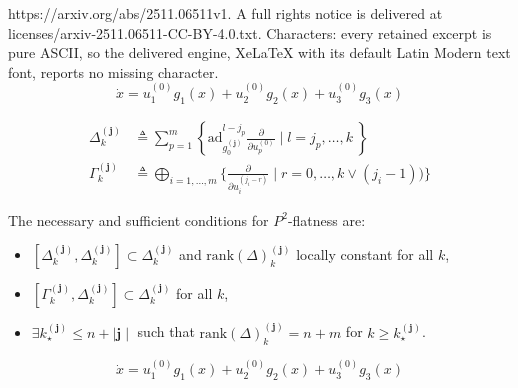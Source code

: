 \documentclass[10pt,a4paper]{amsart}
\newcommand{\ad}{\mathrm{ad}}
\newcommand{\bj}{\mathbf{j}}
\newcommand{\ddu}[2]{\frac{\partial}{\partial u_{#1}^{(#2)}}}
\newcommand{\mbf}[1]{\mathbf{#1}}
\newcommand{\rk}[1]{\mathrm{rank} \left(#1\right)}
\begin{document}
https://arxiv.org/abs/2511.06511v1. A full rights notice is delivered at licenses/arxiv-2511.06511-CC-BY-4.0.txt. Characters: every retained excerpt is pure ASCII, so the delivered engine, XeLaTeX with its default Latin Modern text font, reports no missing character.
\begin{equation}\label{3inputs}
\dot{x} = u_{1}^{(0)}g_{1}(x) + u_{2}^{(0)}g_{2}(x) + u_{3}^{(0)}g_{3}(x)
\end{equation}

\begin{equation}\label{Deltadef:eq}
\begin{aligned}
\Delta_{k}^{(\mbf{j})} &\triangleq \sum_{p=1}^{m} \left\{ \ad_{g_{0}^{(\mbf{j})}}^{l-j_{p}}\ddu{p}{0}  \mid l= j_{p}, \ldots, k\ \right\}\\
\Gamma_{k}^{(\mbf{j})} &\triangleq \bigoplus_{i=1, \ldots, m}\{\ddu{i}{j_{i}-r} \mid r=0, \ldots, k\vee(j_{i}-1))\}
\end{aligned}
\end{equation}

\begin{thm}
\label{CNSP2:thm}
The necessary and sufficient conditions for $P^2$-flatness are:
\begin{itemize}
\item[(i)] $[\Delta_{k}^{(\mbf{j})}, \Delta_{k}^{(\mbf{j})}] \subset \Delta_{k}^{(\mbf{j})}$ and $\rk \Delta_{k}^{(\mbf{j})}$  locally constant for all $k$,
\item[(ii)]$[\Gamma_{k}^{(\mbf{j})}, \Delta_{k}^{(\mbf{j})}] \subset \Delta_{k}^{(\mbf{j})}$ for all $k$,
\item[(iii)] $\exists k_{\star}^{(\mbf{j})} \leq n+\mid \bj \mid$ such that $\rk \Delta_{k}^{(\mbf{j})} = n+m$ for $k\geq k_{\star}^{(\mbf{j})}$.
\end{itemize}
\end{thm}

\begin{equation}\label{sys5-3:eq}
\dot{x} = u_{1}^{(0)}g_{1}(x) + u_{2}^{(0)}g_{2}(x) + u_{3}^{(0)}g_{3}(x)
\end{equation}
\end{document}
